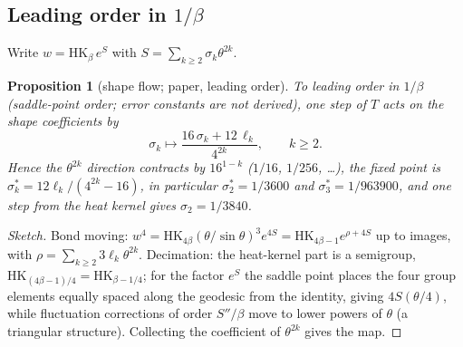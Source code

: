 \documentclass[11pt,a4paper]{article}
\newtheorem{proposition}[theorem]{Proposition}
\theoremstyle{definition}
\theoremstyle{remark}
\newcommand{\HK}{\mathrm{HK}}
\begin{document}
\subsection{\texorpdfstring{Leading order in $1/\beta$}{Leading order in 1/beta}}
Write $w=\HK_\beta\,e^{S}$ with $S=\sum_{k\ge2}\sigma_k\theta^{2k}$.

\begin{proposition}[shape flow; paper, leading order]\label{prop:shape}
To leading order in $1/\beta$ (saddle-point order; error constants are not derived), one step of $T$ acts on the shape coefficients by
\[
\sigma_k\longmapsto\frac{16\,\sigma_k+12\,\ell_k}{4^{2k}},\qquad k\ge2 .
\]
Hence the $\theta^{2k}$ direction contracts by $16^{1-k}$ ($1/16$, $1/256$, \dots), the fixed point is $\sigma_k^*=12\ell_k/(4^{2k}-16)$, in particular $\sigma_2^*=1/3600$ and $\sigma_3^*=1/963900$, and one step from the heat kernel gives $\sigma_2=1/3840$.
\end{proposition}
\begin{proof}[Sketch]
Bond moving: $w^4=\HK_{4\beta}(\theta/\sin\theta)^3e^{4S}=\HK_{4\beta-1}e^{\rho+4S}$ up to images, with $\rho=\sum_{k\ge2}3\ell_k\theta^{2k}$.
Decimation: the heat-kernel part is a semigroup, $\HK_{(4\beta-1)/4}=\HK_{\beta-1/4}$; for the factor $e^{S}$ the saddle point places the four group elements equally spaced along the geodesic from the identity, giving $4S(\theta/4)$, while fluctuation corrections of order $S''/\beta$ move to lower powers of $\theta$ (a triangular structure).
Collecting the coefficient of $\theta^{2k}$ gives the map.
\end{proof}
\end{document}
